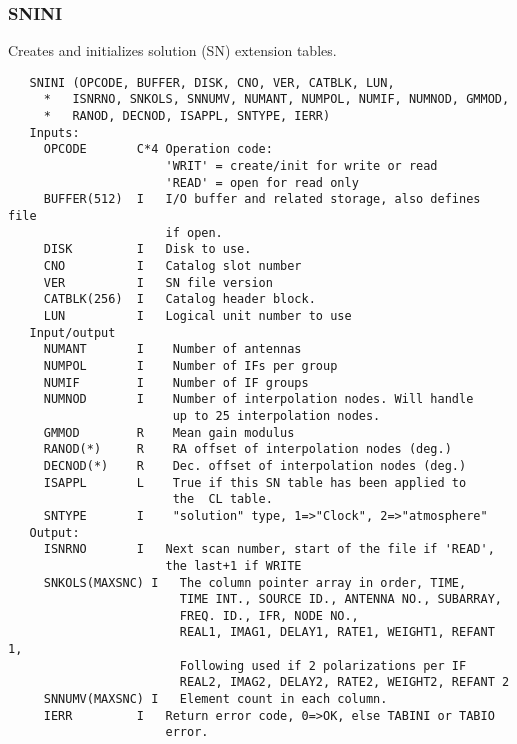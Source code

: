 \subsubsection{SNINI}
Creates and initializes solution (SN) extension tables.
\begin{verbatim}
   SNINI (OPCODE, BUFFER, DISK, CNO, VER, CATBLK, LUN,
     *   ISNRNO, SNKOLS, SNNUMV, NUMANT, NUMPOL, NUMIF, NUMNOD, GMMOD,
     *   RANOD, DECNOD, ISAPPL, SNTYPE, IERR)
   Inputs:
     OPCODE       C*4 Operation code:
                      'WRIT' = create/init for write or read
                      'READ' = open for read only
     BUFFER(512)  I   I/O buffer and related storage, also defines file
                      if open.
     DISK         I   Disk to use.
     CNO          I   Catalog slot number
     VER          I   SN file version
     CATBLK(256)  I   Catalog header block.
     LUN          I   Logical unit number to use
   Input/output
     NUMANT       I    Number of antennas
     NUMPOL       I    Number of IFs per group
     NUMIF        I    Number of IF groups
     NUMNOD       I    Number of interpolation nodes. Will handle
                       up to 25 interpolation nodes.
     GMMOD        R    Mean gain modulus
     RANOD(*)     R    RA offset of interpolation nodes (deg.)
     DECNOD(*)    R    Dec. offset of interpolation nodes (deg.)
     ISAPPL       L    True if this SN table has been applied to
                       the  CL table.
     SNTYPE       I    "solution" type, 1=>"Clock", 2=>"atmosphere"
   Output:
     ISNRNO       I   Next scan number, start of the file if 'READ',
                      the last+1 if WRITE
     SNKOLS(MAXSNC) I   The column pointer array in order, TIME,
                        TIME INT., SOURCE ID., ANTENNA NO., SUBARRAY,
                        FREQ. ID., IFR, NODE NO.,
                        REAL1, IMAG1, DELAY1, RATE1, WEIGHT1, REFANT 1,
                        Following used if 2 polarizations per IF
                        REAL2, IMAG2, DELAY2, RATE2, WEIGHT2, REFANT 2
     SNNUMV(MAXSNC) I   Element count in each column.
     IERR         I   Return error code, 0=>OK, else TABINI or TABIO
                      error.
\end{verbatim}

